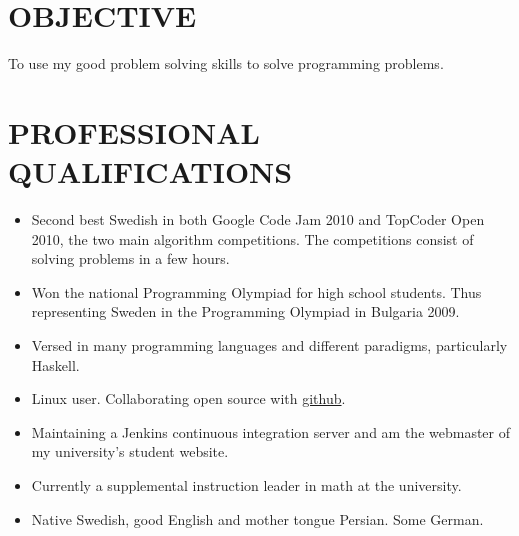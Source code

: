 \documentclass[11pt]{res} %
\begin{document}
 
 

\address{{\bf ADDRESS} \\ Arash Rouhani
                       \\ 464:22 Omgongen
                       \\ 412 80 Gothenburg, Sweden}
\address{{\bf CONTACT} \\ Arash.Rouhani@gmail.com
                       \\+4676 2323 775
                       \\ 1990-11-17 }
 
                                             
\begin{resume}
                                               
 
\section{OBJECTIVE}
To use my good problem solving skills to solve programming problems.

\section{PROFESSIONAL QUALIFICATIONS} 
   \begin{itemize} %
   \item Second best Swedish in both
    Google Code Jam 2010 and TopCoder Open 2010,
    the two main algorithm competitions.
    The competitions consist of solving problems in a few hours.
   \item Won the national Programming Olympiad for high school students.
    Thus representing Sweden in the Programming Olympiad in Bulgaria 2009.
   \item Versed in many programming languages ​​and different paradigms,
    particularly Haskell.
   \item Linux user. Collaborating open source with \hyperref[https://github.com/Tarrasch]{github}.
   \item Maintaining a Jenkins continuous integration server 
    and am the webmaster of my university's student website.
   \item Currently a supplemental instruction leader in math at the university.
   \item Native Swedish, good English and mother tongue Persian. Some German.
 \end{itemize}
 

\end{resume}
\end{document}
